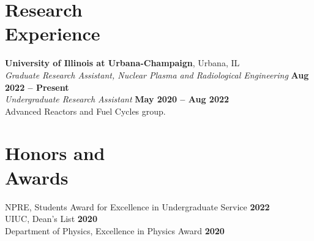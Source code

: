 \documentclass[margin,line]{resume}
\begin{document}
\begin{resume}
    \section{\mysidestyle Research\\Experience}
    \textbf{University of Illinois at Urbana-Champaign}, Urbana, IL\\
                \textsl{Graduate Research Assistant, Nuclear Plasma and Radiological Engineering} \hfill \textbf{Aug 2022 -- Present}\\
                \textsl{Undergraduate Research Assistant} \hfill \textbf{May 2020 -- Aug 2022}\\
                Advanced Reactors and Fuel Cycles group.


   
    \section{\mysidestyle Honors and\\Awards}
                NPRE, Students Award for Excellence in Undergraduate Service \hfill \textbf{2022}\vspace{.5mm}\\%
                UIUC, Dean's List \hfill \textbf{2020}\vspace{.5mm}\\%
                Department of Physics, Excellence in Physics Award \hfill \textbf{2020}\vspace{.5mm}\\%
    


\end{resume}
\end{document}
